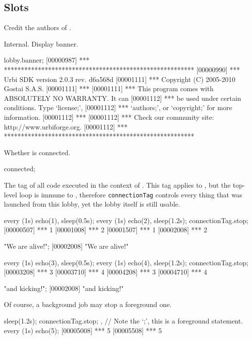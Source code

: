 \subsection{Slots}
\begin{urbiscriptapi}
\item[authors] Credit the authors of \usdk.

\item[banner] Internal.  Display \usdk banner.
\begin{urbiscript}
lobby.banner;
[00000987] *** ********************************************************
[00000990] *** Urbi SDK version 2.0.3 rev. d6a568d
[00001111] *** Copyright (C) 2005-2010 Gostai S.A.S.
[00001111] ***
[00001111] *** This program comes with ABSOLUTELY NO WARRANTY.  It can
[00001112] *** be used under certain conditions.  Type `license;',
[00001112] *** `authors;', or `copyright;' for more information.
[00001112] ***
[00001112] *** Check our community site: http://www.urbiforge.org.
[00001112] *** ********************************************************
\end{urbiscript}

\item[connected]
  Whether \this is connected.
\begin{urbiassert}
connected;
\end{urbiassert}

\item[connectionTag] The tag of all code executed in the context of \this.
  This tag applies to \this, but the top-level loop is immune to
  , therefore \lstinline|connectionTag| controls every
  thing that was launched from this lobby, yet the lobby itself is still
  usable.
\begin{urbiscript}
every (1s) echo(1), sleep(0.5s); every (1s) echo(2),
sleep(1.2s);
connectionTag.stop;
[00000507] *** 1
[00001008] *** 2
[00001507] *** 1
[00002008] *** 2

"We are alive!";
[00002008] "We are alive!"

every (1s) echo(3), sleep(0.5s); every (1s) echo(4),
sleep(1.2s);
connectionTag.stop;
[00003208] *** 3
[00003710] *** 4
[00004208] *** 3
[00004710] *** 4

"and kicking!";
[00002008] "and kicking!"
\end{urbiscript}

  Of course, a background job may stop a foreground one.
\begin{urbiscript}
{ sleep(1.2s); connectionTag.stop; },
// Note the `;', this is a foreground statement.
every (1s) echo(5);
[00005008] *** 5
[00005508] *** 5


\end{urbiscript}
\end{urbiscriptapi}
